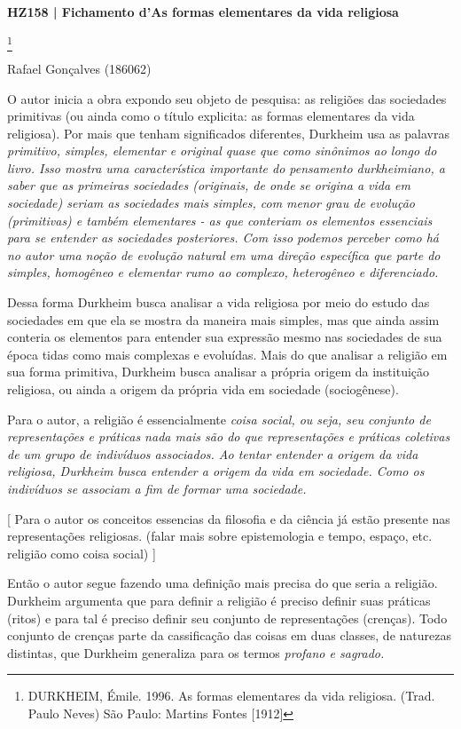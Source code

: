 \documentclass[12pt,a4paper]{article}
\begin{document}
\noindent
\centerline{\large\textbf{HZ158 | Fichamento d'As formas elementares da vida religiosa}}\footnote{DURKHEIM, Émile. 1996. As formas elementares da vida religiosa. (Trad. Paulo Neves) São Paulo: Martins Fontes [1912]}
\centerline{\large Rafael Gonçalves (186062)}
\break
\noindent
O autor inicia a obra expondo seu objeto de pesquisa: as religiões das sociedades primitivas (ou ainda como o título explicita: as formas elementares da vida religiosa). Por mais que tenham significados diferentes, Durkheim usa as palavras \em primitivo\em , \em simples\em , \em elementar \em e \em original \em quase que como sinônimos ao longo do livro. Isso mostra uma característica importante do pensamento durkheimiano, a saber que as primeiras sociedades (originais, de onde se origina a vida em sociedade) seriam as sociedades mais simples, com menor grau de evolução (primitivas) e também elementares - as que conteriam os elementos essenciais para se entender as sociedades posteriores. Com isso podemos perceber como há no autor uma noção de evolução \em natural \em em uma direção específica que parte do simples, homogêneo e elementar rumo ao complexo, heterogêneo e diferenciado.

Dessa forma Durkheim busca analisar a vida religiosa por meio do estudo das sociedades em que ela se mostra da maneira mais simples, mas que ainda assim conteria os elementos para entender sua expressão mesmo nas sociedades de sua época tidas como mais complexas e evoluídas. Mais do que analisar a religião em sua forma primitiva, Durkheim busca analisar a própria origem da instituição religiosa, ou ainda a origem da própria vida em sociedade (sociogênese).

Para o autor, a religião é essencialmente \em coisa social\em, ou seja, seu conjunto de representações e práticas nada mais são do que representações e práticas coletivas de um grupo de indivíduos associados. Ao tentar entender a origem da vida religiosa, Durkheim busca entender a origem da vida em sociedade. Como os indivíduos se associam a fim de formar uma sociedade.

[
Para o autor os conceitos essencias da filosofia e da ciência já estão presente nas representações religiosas. (falar mais sobre epistemologia e tempo, espaço, etc. religião como coisa social)
]

Então o autor segue fazendo uma definição mais precisa do que seria a religião. Durkheim argumenta que para definir a religião é preciso definir suas práticas (ritos) e para tal é preciso definir seu conjunto de representações (crenças). Todo conjunto de crenças parte da cassificação das coisas em duas classes, de naturezas distintas, que Durkheim generaliza para os termos \em profano \em e \em sagrado\em .
\end{document}
